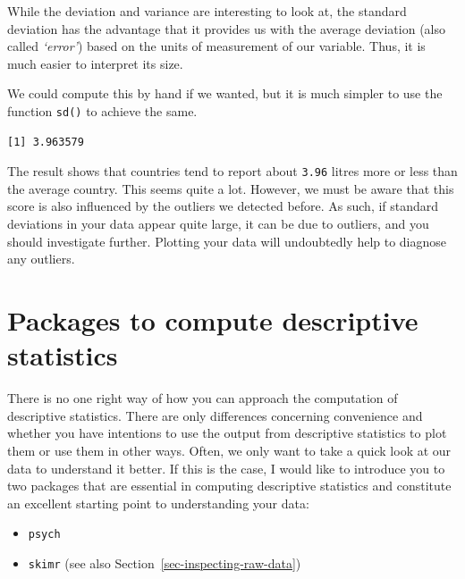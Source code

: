 \documentclass[
  letterpaper,
]{krantz}
\makeatletter
\newenvironment{Shaded}{\begin{snugshade}}{\end{snugshade}}
\newcommand{\FunctionTok}[1]{\textcolor[rgb]{0.28,0.35,0.67}{#1}}
\newcommand{\NormalTok}[1]{\textcolor[rgb]{0.00,0.23,0.31}{#1}}
\newcommand{\SpecialCharTok}[1]{\textcolor[rgb]{0.37,0.37,0.37}{#1}}
\newenvironment{kframe}{%
\medskip{}
\setlength{\fboxsep}{.8em}
 \def\at@end@of@kframe{}%
 \ifinner\ifhmode%
  \def\at@end@of@kframe{\end{minipage}}%
  \begin{minipage}{\columnwidth}%
 \fi\fi%
 \def\FrameCommand##1{\hskip\@totalleftmargin \hskip-\fboxsep
 \colorbox{shadecolor}{##1}\hskip-\fboxsep
     \hskip-\linewidth \hskip-\@totalleftmargin \hskip\columnwidth}%
 \MakeFramed {\advance\hsize-\width
   \@totalleftmargin\z@ \linewidth\hsize
   \@setminipage}}%
 {\par\unskip\endMakeFramed%
 \at@end@of@kframe}
\renewenvironment{Shaded}{\begin{kframe}}{\end{kframe}}
\makeatother
\begin{document}
While the deviation and variance are interesting to look at, the
standard deviation has the advantage that it provides us with the
average deviation (also called \emph{`error'}) based on the units of
measurement of our variable. Thus, it is much easier to interpret its
size.

We could compute this by hand if we wanted, but it is much simpler to
use the function \texttt{sd()} to achieve the same.

\begin{Shaded}
\end{Shaded}

\begin{verbatim}
[1] 3.963579
\end{verbatim}

The result shows that countries tend to report about \texttt{3.96}
litres more or less than the average country. This seems quite a lot.
However, we must be aware that this score is also influenced by the
outliers we detected before. As such, if standard deviations in your
data appear quite large, it can be due to outliers, and you should
investigate further. Plotting your data will undoubtedly help to
diagnose any outliers.

\section{Packages to compute descriptive
statistics}\label{sec-packages-for-descriptive-statistics}

There is no one right way of how you can approach the computation of
descriptive statistics. There are only differences concerning
convenience and whether you have intentions to use the output from
descriptive statistics to plot them or use them in other ways. Often, we
only want to take a quick look at our data to understand it better. If
this is the case, I would like to introduce you to two packages that are
essential in computing descriptive statistics and constitute an
excellent starting point to understanding your data:

\begin{itemize}
\item
  \texttt{psych}
\item
  \texttt{skimr} (see also Section~\ref{sec-inspecting-raw-data})
\end{itemize}
\end{document}
